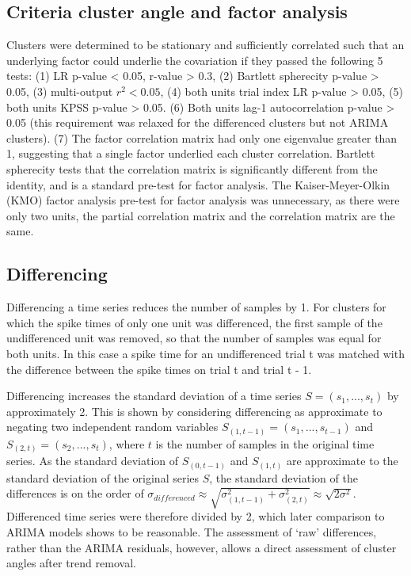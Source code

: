 \documentclass{article}
\begin{document}
\subsection{Criteria cluster angle and factor analysis}
\label{methods:angle_and_factor_analysis_criteria}

Clusters were determined to be stationary and sufficiently correlated such that an underlying factor could underlie the covariation if they passed the following 5 tests: (1) LR p-value < 0.05, r-value > 0.3, (2) Bartlett spherecity p-value > 0.05, (3) multi-output $r^2 < 0.05$, (4) both units trial index LR p-value > 0.05, (5) both units KPSS p-value > 0.05. (6) Both units lag-1 autocorrelation p-value > 0.05 (this requirement was relaxed for the differenced clusters but not ARIMA clusters). (7) The factor correlation matrix had only one eigenvalue greater than 1, suggesting that a single factor underlied each cluster correlation. Bartlett spherecity tests that the correlation matrix is significantly different from the identity, and is a standard pre-test for factor analysis. The Kaiser-Meyer-Olkin (KMO) factor analysis pre-test for factor analysis was unnecessary, as there were only two units, the partial correlation matrix and the correlation matrix are the same.




\subsection{Differencing}
\label{methods:differencing}

Differencing a time series reduces the number of samples by 1.
For clusters for which the spike times of only one unit was differenced, the first sample of the undifferenced unit was removed, so that the number of samples was equal for both units. In this case a spike time for an undifferenced trial t was matched with the difference between the spike times on trial t and trial t - 1.

Differencing increases the standard deviation of a time series $S = (s_1, ..., s_t)$ by approximately 2. This is shown by considering differencing as approximate to negating two independent random variables $S_{(1, t-1)} = (s_1, ..., s_{t-1})$ and $S_{(2, t)} = (s_2, ..., s_t)$, where $t$ is the number of samples in the original time series. As the standard deviation of $S_{(0, t-1)}$ and $S_{(1, t)}$ are approximate to the standard deviation of the original series $S$, the standard deviation of the differences is on the order of \(\sigma_{differenced} \approx \sqrt{\sigma_{(1, t-1)}^2 + \sigma_{(2, t)}^2} \approx  \sqrt{2\sigma^2} \).  Differenced time series were therefore divided by 2, which later comparison to ARIMA models shows to be reasonable. The assessment of `raw' differences, rather than the ARIMA residuals, however, allows a direct assessment of cluster angles after trend removal.
\end{document}
